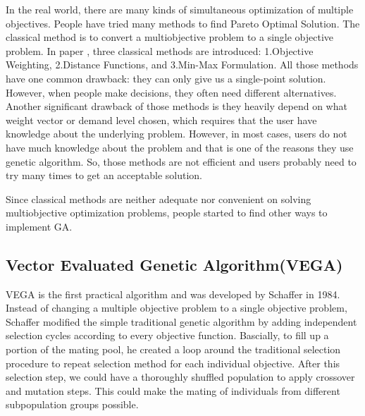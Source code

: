 In the real world, there are many kinds of simultaneous optimization of multiple objectives. People have tried many methods to find Pareto Optimal Solution. The classical method is to convert a multiobjective problem to a single objective problem. In paper \cite{NSGA_1994}, three classical methods are introduced: 1.Objective Weighting, 2.Distance Functions, and 3.Min-Max Formulation. All those methods have one common drawback: they can only give us a single-point solution. However, when people make decisions, they often need different alternatives. Another significant drawback of those methods is they heavily depend on what weight vector or demand level chosen, which requires that the user have knowledge about the underlying problem. However, in most cases, users do not have much knowledge about the problem and that is one of the reasons they use genetic algorithm. So, those methods are not efficient and users probably need to try many times to get an acceptable solution.

Since classical methods are neither adequate nor convenient on solving multiobjective optimization problems, people started to find other ways to implement GA.

\subsection{Vector Evaluated Genetic Algorithm(VEGA)}
VEGA is the first practical algorithm and was developed by Schaffer in 1984\cite{Schaffer_1984_Some}. Instead of changing a multiple objective problem to a single objective problem, Schaffer modified the simple traditional genetic algorithm by adding independent selection cycles according to every objective function\cite{Schaffer_1984_Some}. Bascially, to fill up a portion of the mating pool, he created a loop around the traditional selection procedure to repeat selection method for each individual objective. After this selection step, we could have a thoroughly shuffled population to apply crossover and mutation steps. This could make the mating of individuals from different subpopulation groups possible.

